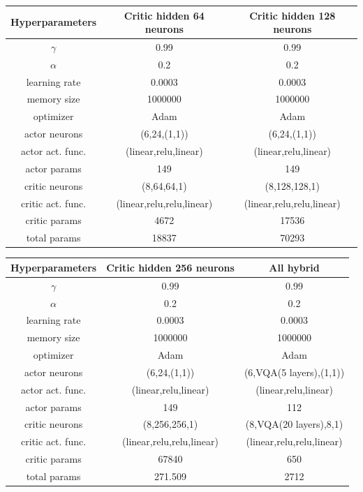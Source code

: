 \newline
\vspace{0.5 cm}
\newline
\begin{tabular}{|c|c|c|}
	\hline
	Hyperparameters & Critic hidden 64 neurons & Critic hidden 128 neurons \\
	\hline
	$\gamma$ & 0.99 & 0.99  \\
	\hline
	$\alpha$ & 0.2 & 0.2  \\
	\hline
	learning rate & 0.0003 & 0.0003  \\
	\hline
	memory size & 1000000 & 1000000   \\
	\hline
	optimizer & Adam & Adam  \\
	\hline
	actor neurons & (6,24,(1,1)) & (6,24,(1,1))  \\
	\hline
	actor act. func. & (linear,relu,linear) & (linear,relu,linear) \\
	\hline
	actor params & 149 & 149 \\
	\hline
	critic neurons & (8,64,64,1) & (8,128,128,1)  \\
	\hline
	critic act. func. & (linear,relu,relu,linear) & (linear,relu,relu,linear) \\
	\hline
	critic params & 4672 & 17536 \\
	\hline
	total params & 18837 & 70293 \\
	\hline
\end{tabular}
\newline
\vspace{0.5 cm}
\newline
\begin{tabular}{|c|c|c|}
	\hline
	Hyperparameters & Critic hidden 256 neurons & All hybrid \\
	\hline
	$\gamma$ & 0.99 & 0.99  \\
	\hline
	$\alpha$ & 0.2 & 0.2  \\
	\hline
	learning rate & 0.0003 & 0.0003  \\
	\hline
	memory size & 1000000 & 1000000   \\
	\hline
	optimizer & Adam & Adam  \\
	\hline
	actor neurons & (6,24,(1,1)) & (6,VQA(5 layers),(1,1))  \\
	\hline
	actor act. func. & (linear,relu,linear) & (linear,relu,linear) \\
	\hline
	actor params & 149 & 112 \\
	\hline
	critic neurons & (8,256,256,1) & (8,VQA(20 layers),8,1)  \\
	\hline
	critic act. func. & (linear,relu,relu,linear) & (linear,relu,relu,linear) \\
	\hline
	critic params & 67840 & 650 \\
	\hline
	total params & 271.509 & 2712 \\
	\hline
\end{tabular}
